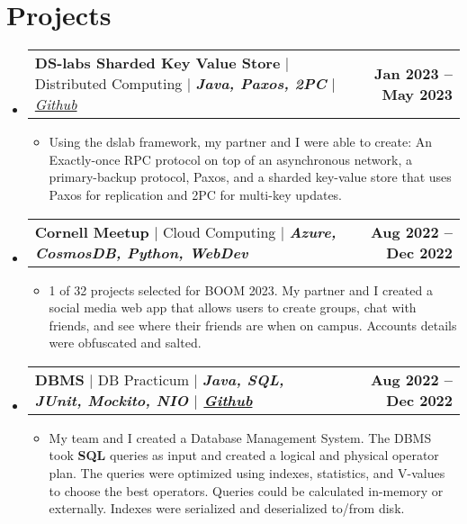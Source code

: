 \documentclass[letterpaper,11pt]{article}
\makeatletter
\newcommand{\resumeItem}[1]{
  \item\small{
    {#1 \vspace{-2pt}}
  }
}
\newcommand{\resumeProjectHeading}[2]{
    \item
    \begin{tabular*}{1.001\textwidth}{l@{\extracolsep{\fill}}r}
      \small#1 & \textbf{\small #2}\\
    \end{tabular*}\vspace{-7pt}
}
\newcommand{\resumeSubHeadingListStart}{\begin{itemize}[leftmargin=0.0in, label={}]}
\newcommand{\resumeSubHeadingListEnd}{\end{itemize}}
\newcommand{\resumeItemListStart}{\begin{itemize}}
\newcommand{\resumeItemListEnd}{\end{itemize}\vspace{-5pt}}
\makeatother
\begin{document}
\section{Projects}
    \vspace{-6pt}
    \resumeSubHeadingListStart
    \resumeProjectHeading
          {\textbf{DS-labs Sharded Key Value Store} $|$ Distributed Computing $|$ \textbf{\emph{Java, Paxos, 2PC}}\emph{ $|$
          \href{https://github.com/emichael/dslabs}{Github}}}{Jan 2023 -- May 2023}
          \resumeItemListStart
            \resumeItem{ Using the dslab framework, my partner and I were able to create:
            An Exactly-once RPC protocol on top of an asynchronous network, a primary-backup protocol, 
            Paxos, and a sharded key-value store that uses Paxos for replication and 2PC for multi-key updates.}
          \resumeItemListEnd
          \vspace{-14pt}
    \resumeProjectHeading
          {\textbf{Cornell Meetup} $|$ Cloud Computing $|$ \textbf{\emph{Azure, CosmosDB, Python, WebDev}}\emph{ $|$
          \href{https://github.com/MitchellGray100/CornellMeetUp}{Github}
          $|$ \href{https://cis.cornell.edu/about/outreach-events/boom-bits-our-minds/projects/boom-2023-projects}}
          {BOOM}}{Aug 2022 -- Dec 2022}
          \resumeItemListStart
            \resumeItem{ 1 of 32 projects selected for BOOM 2023. My partner and I created a 
            social media web app that allows users to create groups, chat with friends,
            and see where their friends are when on campus. Accounts details were obfuscated and salted.}
          \resumeItemListEnd
          \vspace{-14pt}
    \resumeProjectHeading
          {\textbf{DBMS} $|$ DB Practicum $|$ \textbf{\emph{Java, SQL, JUnit, Mockito, NIO}\emph{ $|$
          \href{https://github.com/MitchellGray100/DBMS}{Github}}}}{Aug 2022 -- Dec 2022}
          \resumeItemListStart
            \resumeItem{ My team and I created a Database Management System. The DBMS   
            took \textbf{SQL} queries as input and created a logical and physical operator plan. The queries were   
            optimized using indexes, statistics, and V-values to choose the best operators. 
            Queries could be calculated in-memory or externally. Indexes were 
            serialized and deserialized to/from disk.
            }
          \resumeItemListEnd
          \vspace{-14pt}
    \resumeSubHeadingListEnd
\vspace{-3pt}
\end{document}
